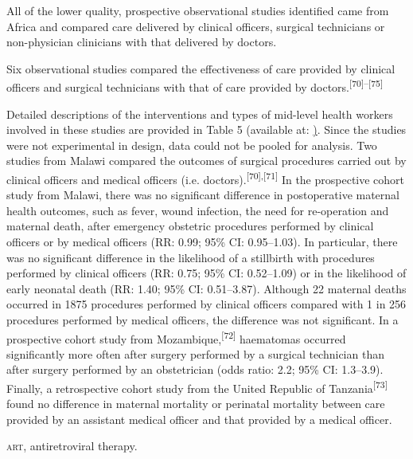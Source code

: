\documentclass{article}
\begin{document}
All of the lower quality, prospective observational studies identified came from
Africa and
compared care delivered by clinical officers, surgical technicians or
non-physician clinicians with
that delivered by doctors.

Six observational studies compared the effectiveness of care provided by
clinical officers and
surgical technicians with that of care provided by
doctors.\textsuperscript{[}\textsuperscript{70}\textsuperscript{]}\textsuperscript{–}\textsuperscript{[}\textsuperscript{75}\textsuperscript{]}

Detailed descriptions of the interventions and types of mid-level health workers
involved in these
studies are provided in Table 5 (available at:
\href{http://www.who.int/bulletin/volumes/91/11/13-118786}). Since the studies
were not
experimental in design, data could not be pooled for analysis. Two studies from
Malawi compared the
outcomes of surgical procedures carried out by clinical officers and medical
officers (i.e.
doctors).\textsuperscript{[}\textsuperscript{70}\textsuperscript{]}\textsuperscript{,}\textsuperscript{[}\textsuperscript{71}\textsuperscript{]}
In the prospective cohort study from Malawi, there was no significant
difference in postoperative maternal health outcomes, such as fever, wound
infection, the need for
re-operation and maternal death, after emergency obstetric procedures performed
by clinical officers
or by medical officers (RR: 0.99; 95\% CI: 0.95–1.03). In particular, there was
no significant
difference in the likelihood of a stillbirth with procedures performed by
clinical officers (RR:
0.75; 95\% CI: 0.52–1.09) or in the likelihood of early neonatal death (RR:
1.40; 95\% CI:
0.51–3.87). Although 22 maternal deaths occurred in 1875 procedures performed by
clinical
officers compared with 1 in 256 procedures performed by medical officers, the
difference was not
significant. In a prospective cohort study from
Mozambique,\textsuperscript{[}\textsuperscript{72}\textsuperscript{]}
haematomas occurred significantly more often after surgery performed by a
surgical technician than after surgery performed by an obstetrician (odds ratio:
2.2; 95\% CI:
1.3–3.9). Finally, a retrospective cohort study from the United Republic of
Tanzania\textsuperscript{[}\textsuperscript{73}\textsuperscript{]}
found no difference in maternal mortality or
perinatal mortality between care provided by an assistant medical officer and
that provided by a
medical officer.

\textsc{art}, antiretroviral therapy.
\end{document}
